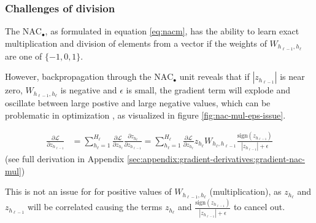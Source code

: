 \subsubsection{Challenges of division} \label{sssec:nac-mul}

The $\text{NAC}_{\bullet}$, as formulated in equation \ref{eq:nacm}, has the ability to learn exact multiplication and division of elements from a vector if the weights of $W_{h_{\ell-1},h_\ell}$ are one of $\{-1, 0, 1\}$.

However, backpropagation through the $\text{NAC}_{\bullet}$ unit reveals that if $|z_{h_{\ell-1}}|$ is near zero, $W_{h_{\ell-1},h_\ell}$ is negative and $\epsilon$ is small, the gradient term will explode and oscillate between large postive and large negative values, which can be problematic in optimization \cite{adam-optimization}, as visualized in figure \ref{fig:nac-mul-eps-issue}.

\begin{align}
\frac{\partial \mathcal{L}}{\partial z_{h_{\ell-1}}} &= \sum_{h_\ell = 1}^{H_\ell} \frac{\partial \mathcal{L}}{\partial z_{h_\ell}} \frac{\partial z_{h_\ell}}{\partial z_{h_{\ell-1}}} = \sum_{h_\ell = 1}^{H_\ell} \frac{\partial \mathcal{L}}{\partial z_{h_\ell}} z_{h_\ell} W_{h_\ell, h_{\ell-1}} \frac{\mathrm{sign}(z_{h_{\ell-1}})}{|z_{h_{\ell-1}}| + \epsilon}\label{eq:dz}
\end{align}
(see full derivation in Appendix \ref{sec:appendix:gradient-derivatives:gradient-nac-mul})

This is not an issue for for positive values of $W_{h_{\ell-1},h_\ell}$ (multiplication), as $z_{h_{\ell}}$ and $z_{h_{\ell-1}}$ will be correlated causing the terms $z_{h_\ell}$ and $\frac{\mathrm{sign}(z_{h_{\ell-1}})}{|z_{h_{\ell-1}}| + \epsilon}$ to cancel out.

